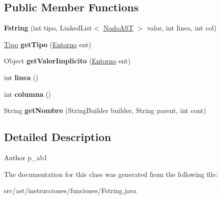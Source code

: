 \subsection*{Public Member Functions}
\begin{DoxyCompactItemize}
\item 
\mbox{\label{classast_1_1instrucciones_1_1funciones_1_1_fstring_a72a39df29473431ae389c39e46c68a9f}} 
{\bfseries Fstring} (int tipo, Linked\+List$<$ \mbox{\hyperlink{interfaceast_1_1_nodo_a_s_t}{Nodo\+A\+ST}} $>$ valor, int linea, int col)
\item 
\mbox{\label{classast_1_1instrucciones_1_1funciones_1_1_fstring_ab82a7413094cc0f7cfd2fee6154dfc32}} 
\mbox{\hyperlink{classentorno_1_1_tipo}{Tipo}} {\bfseries get\+Tipo} (\mbox{\hyperlink{classentorno_1_1_entorno}{Entorno}} ent)
\item 
\mbox{\label{classast_1_1instrucciones_1_1funciones_1_1_fstring_af0ff90be18a90396c724e48e9181d7bf}} 
Object {\bfseries get\+Valor\+Implicito} (\mbox{\hyperlink{classentorno_1_1_entorno}{Entorno}} ent)
\item 
\mbox{\label{classast_1_1instrucciones_1_1funciones_1_1_fstring_a36d5b53a469376042f07960c110fd1f0}} 
int {\bfseries linea} ()
\item 
\mbox{\label{classast_1_1instrucciones_1_1funciones_1_1_fstring_ae9316037ad4f53e4fcfbe36446473ee7}} 
int {\bfseries columna} ()
\item 
\mbox{\label{classast_1_1instrucciones_1_1funciones_1_1_fstring_a0239f774aa2f7b262bcc4bcf3a636f73}} 
String {\bfseries get\+Nombre} (String\+Builder builder, String parent, int cont)
\end{DoxyCompactItemize}


\subsection{Detailed Description}
\begin{DoxyAuthor}{Author}
p\+\_\+ab1 
\end{DoxyAuthor}


The documentation for this class was generated from the following file\+:\begin{DoxyCompactItemize}
\item 
src/ast/instrucciones/funciones/Fstring.\+java\end{DoxyCompactItemize}
